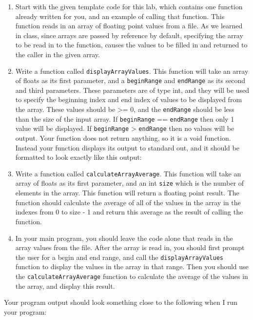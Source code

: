 \documentclass[11pt]{article}
\begin{document}
\begin{enumerate}
\item Start with the given template code for this lab, which contains one
   function already written for you, and an example of calling that
   function.  This function reads in an array of floating point values
   from a file.  As we learned in class, since arrays are passed by
   reference by default, specifying the array to be read in to the
   function, causes the values to be filled in and returned to the
   caller in the given array.
\item Write a function called \verb~displayArrayValues~.  This function will
   take an array of floats as its first parameter, and a \verb~beginRange~
   and \verb~endRange~ as its second and third parameters.  These
   parameters are of type int, and they will be used to specify the
   beginning index and end index of values to be displayed from the
   array.  These values should be >= 0, and the \verb~endRange~ should be
   less than the size of the input array.  If \verb~beginRange~ ==
   \verb~endRange~ then only 1 value will be displayed.  If \verb~beginRange~ >
   \verb~endRange~ then no values will be output. Your function does not
   return anything, so it is a void function.  Instead your function
   displays its output to standard out, and it should be formatted to
   look exactly like this output:
\item Write a function called \verb~calculateArrayAverage~.  This function will
   take an array of floats as its first parameter, and an int \verb~size~ which
   is the number of elements in the array.  This function will return
   a floating point result.  The function should calculate the average
   of all of the values in the array in the indexes from 0 to size - 1
   and return this average as the result of calling the function.
\item In your main program, you should leave the code alone that reads in
   the array values from the file.  After the array is read in, you
   should first prompt the user for a begin and end range, and call the
   \verb~displayArrayValues~ function to display the values in the array in
   that range.  Then you should use the \verb~calculateArrayAverage~ function
   to calculate the average of the values in the array, and display
   this result.
\end{enumerate}

Your program output should look something close to the following when I
run your program:
\end{document}
